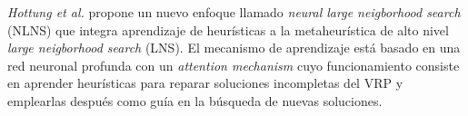 
\textit{Hottung et al.} \cite{NeuralLargeHottung} propone un nuevo enfoque llamado \textit{neural large neigborhood search} (NLNS) que integra aprendizaje de heurísticas a la metaheurística de alto nivel \textit{large neigborhood search} (LNS). El mecanismo de aprendizaje está basado en una red neuronal profunda con un \textit{attention mechanism} cuyo funcionamiento consiste en aprender heurísticas para reparar soluciones incompletas del VRP y emplearlas después como guía en la búsqueda de nuevas soluciones. \\






























